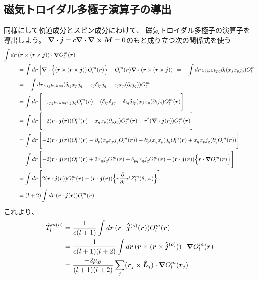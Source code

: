\documentclass[../../master.tex]{subfiles}
\begin{document}
\subsection{磁気トロイダル多極子演算子の導出}
同様にして軌道成分とスピン成分にわけて、
磁気トロイダル多極子の演算子を導出しよう。
\(\div \vb*{j}= c\div \curl \vb*{M}=0\)のもと成り立つ次の関係式を使う
\begin{align}
    \int d\vb*{r}\,& (\vb*{r}\times(\vb*{r}\times \vb*{j})) \cdot \grad O_l^m(\vb*{r}) \notag\\
    &= \int d\vb*{r}\, \qty[\div\Bigl\{(\vb*{r}\times(\vb*{r}\times \vb*{j}))\,O_l^m(\vb*{r})\Bigr\}
    -O_l^m(\vb*{r})\div(\vb*{r}\times(\vb*{r}\times \vb*{j}))]
    = - \int d\vb*{r}\, \varepsilon_{ijk}\varepsilon_{kpq}\partial_i(x_j x_p j_q)O_l^m\\
    &= - \int d\vb*{r}\, \varepsilon_{ijk}\varepsilon_{kpq}(\delta_{ij}x_p j_q + x_j \delta_{ip} j_q + x_j x_p( \partial_i j_q))O_l^m\\
    &= \int d\vb*{r}\,\Biggl[- \varepsilon_{pjk}\varepsilon_{kpq} x_j j_q O_l^m(\vb*{r})
    - (\delta_{ip}\delta_{jq}-\delta_{iq}\delta_{jp})x_j x_p (\partial_i j_q) O_l^m(\vb*{r})\Biggr]\\
    &= \int d\vb*{r}\,\Biggl[ -2(\vb*{r}\cdot\vb*{j}(\vb*{r})) O_l^m(\vb*{r})
    - x_q x_p (\partial_p j_q) O_l^m(\vb*{r})
    + r^2(\div \vb*{j}(\vb*{r})) O_l^m(\vb*{r}) \Biggr]\\
    &= \int d\vb*{r}\, \Biggl[-2(\vb*{r}\cdot\vb*{j}(\vb*{r})) O_l^m(\vb*{r})
    - \partial_p\qty( x_q x_p j_q O_l^m(\vb*{r}))
    + \partial_p(x_q x_p) j_q O_l^m(\vb*{r})
    + x_q x_p j_q (\partial_q O_l^m(\vb*{r})) \Biggr]\\
    &= \int d\vb*{r}\, \Biggl[-2(\vb*{r}\cdot\vb*{j}(\vb*{r})) O_l^m(\vb*{r})
    + 3 x_q j_q O_l^m(\vb*{r})
    + \delta_{pq}x_q j_q O_l^m(\vb*{r})
    + (\vb*{r}\cdot \vb*{j}(\vb*{r})) \Bigl\{\vb*{r}\cdot \grad O_l^m(\vb*{r})\Bigr\}\Biggr]\\
    &= \int d\vb*{r}\, \Biggl[2(\vb*{r}\cdot\vb*{j}(\vb*{r})) O_l^m(\vb*{r})
    + (\vb*{r}\cdot \vb*{j}(\vb*{r})) \Bigl\{r\pdv{r}r^l Z_l^m(\theta,\,\varphi)\Bigr\}\Biggr]\\
    &= (l+2)\int d\vb*{r}\, (\vb*{r}\cdot\vb*{j}(\vb*{r})) O_l^m(\vb*{r})
\end{align}
これより、
\begin{align}
    \hat{T}_l^{m(o)} &= \frac{1}{c(l+1)} \int d\vb*{r}\, (\vb*{r}\cdot \vb*{\hat{j}}^{(o)}(\vb*{r}))O_l^m(\vb*{r})\\
    &=\frac{1}{c(l+1)(l+2)}\int d\vb*{r}\, (\vb*{r}\times(\vb*{r}\times \vb*{\hat{j}}^{(o)})) \cdot \grad O_l^m(\vb*{r})\\
    &= \frac{-2\mu_B}{(l+1)(l+2)}\sum_j (\vb*{r}_j\times \vb*{\hat{L}}_j) \cdot \grad O_l^m(\vb*{r}_j)
\end{align}
\end{document}
